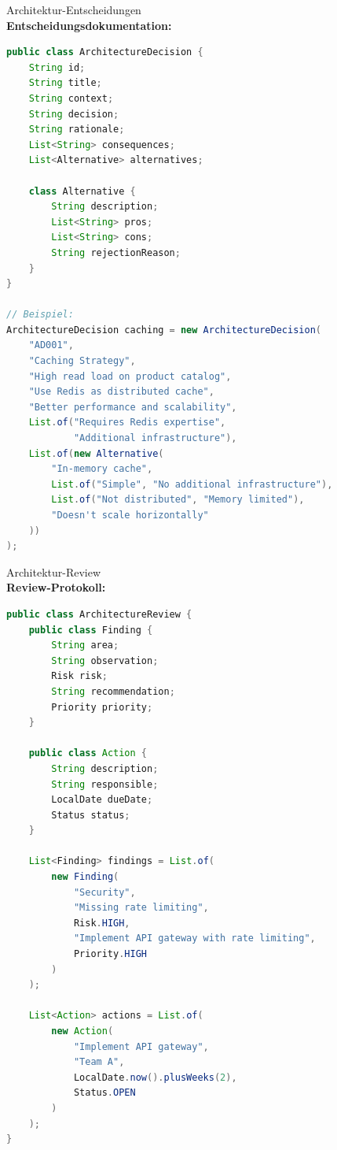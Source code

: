 \begin{example2}{Architektur-Entscheidungen}\\
\textbf{Entscheidungsdokumentation:}

\begin{lstlisting}[language=Java, style=basesmol]
public class ArchitectureDecision {
    String id;
    String title;
    String context;
    String decision;
    String rationale;
    List<String> consequences;
    List<Alternative> alternatives;
    
    class Alternative {
        String description;
        List<String> pros;
        List<String> cons;
        String rejectionReason;
    }
}

// Beispiel:
ArchitectureDecision caching = new ArchitectureDecision(
    "AD001",
    "Caching Strategy",
    "High read load on product catalog",
    "Use Redis as distributed cache",
    "Better performance and scalability",
    List.of("Requires Redis expertise", 
            "Additional infrastructure"),
    List.of(new Alternative(
        "In-memory cache",
        List.of("Simple", "No additional infrastructure"),
        List.of("Not distributed", "Memory limited"),
        "Doesn't scale horizontally"
    ))
);
\end{lstlisting}
\end{example2}

\begin{example2}{Architektur-Review}\\
\textbf{Review-Protokoll:}

\begin{lstlisting}[language=Java, style=basesmol]
public class ArchitectureReview {
    public class Finding {
        String area;
        String observation;
        Risk risk;
        String recommendation;
        Priority priority;
    }
    
    public class Action {
        String description;
        String responsible;
        LocalDate dueDate;
        Status status;
    }
    
    List<Finding> findings = List.of(
        new Finding(
            "Security",
            "Missing rate limiting",
            Risk.HIGH,
            "Implement API gateway with rate limiting",
            Priority.HIGH
        )
    );
    
    List<Action> actions = List.of(
        new Action(
            "Implement API gateway",
            "Team A",
            LocalDate.now().plusWeeks(2),
            Status.OPEN
        )
    );
}
\end{lstlisting}
\end{example2}